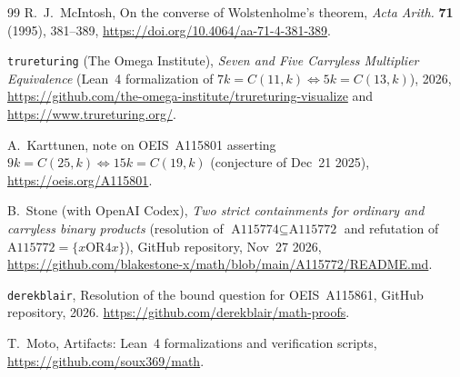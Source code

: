\documentclass[11pt]{article}
\begin{document}
\begin{thebibliography}{99}
R.~J.~McIntosh, On the converse of Wolstenholme's theorem, \emph{Acta Arith.} \textbf{71} (1995), 381--389, \url{https://doi.org/10.4064/aa-71-4-381-389}.

\texttt{trureturing} (The Omega Institute), \emph{Seven and Five Carryless Multiplier Equivalence} (Lean~4 formalization of $7k = C(11,k) \iff 5k = C(13,k)$), 2026, \url{https://github.com/the-omega-institute/trureturing-visualize} and \url{https://www.trureturing.org/}.

A.~Karttunen, note on OEIS~A115801 asserting $9k = C(25,k) \iff 15k = C(19,k)$ (conjecture of Dec~21 2025), \url{https://oeis.org/A115801}.

B.~Stone (with OpenAI Codex), \emph{Two strict containments for ordinary and carryless binary products} (resolution of $\text{A115774} \subseteq \text{A115772}$ and refutation of $\text{A115772} = \{x \mathbin{\mathrm{OR}} 4x\}$), GitHub repository, Nov~27 2026, \url{https://github.com/blakestone-x/math/blob/main/A115772/README.md}.

\texttt{derekblair}, Resolution of the bound question for OEIS~A115861, GitHub repository, 2026. \url{https://github.com/derekblair/math-proofs}.

T.~Moto, Artifacts: Lean~4 formalizations and verification scripts, \url{https://github.com/soux369/math}.
\end{thebibliography}
\end{document}
